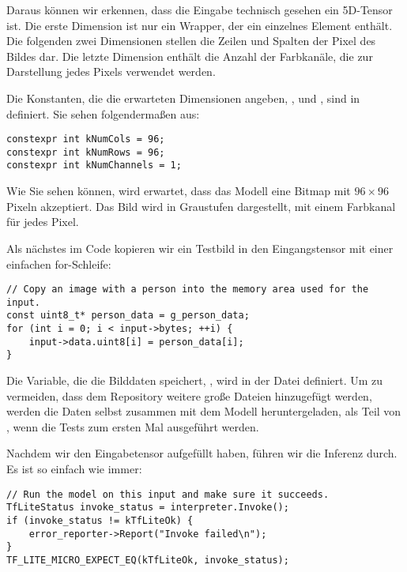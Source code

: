Daraus können wir erkennen, dass die Eingabe technisch gesehen ein 5D-Tensor ist. Die erste Dimension ist nur ein Wrapper, der ein einzelnes Element enthält. Die folgenden zwei Dimensionen stellen die Zeilen und Spalten der Pixel des Bildes dar. Die letzte Dimension enthält die Anzahl der Farbkanäle, die zur Darstellung jedes Pixels verwendet werden.

Die Konstanten, die die erwarteten Dimensionen angeben, ,  und , sind in  definiert. Sie sehen folgendermaßen aus:

\begin{code}
    \begin{lstlisting}
constexpr int kNumCols = 96;
constexpr int kNumRows = 96;
constexpr int kNumChannels = 1;
  \end{lstlisting}
\end{code}

Wie Sie sehen können, wird erwartet, dass das Modell eine Bitmap mit $96 \times 96$ Pixeln akzeptiert. Das Bild wird in Graustufen dargestellt, mit einem Farbkanal für jedes Pixel.

Als nächstes im Code kopieren wir ein Testbild in den Eingangstensor mit einer einfachen for-Schleife:

\begin{code}
    \begin{lstlisting}
// Copy an image with a person into the memory area used for the input.
const uint8_t* person_data = g_person_data;
for (int i = 0; i < input->bytes; ++i) {
    input->data.uint8[i] = person_data[i];
}
  \end{lstlisting}
\end{code}

Die Variable, die die Bilddaten speichert, , wird in der Datei  definiert. Um zu vermeiden, dass dem Repository weitere große Dateien hinzugefügt werden, werden die Daten selbst zusammen mit dem Modell heruntergeladen, als Teil von , wenn die Tests zum ersten Mal ausgeführt werden.

Nachdem wir den Eingabetensor aufgefüllt haben, führen wir die Inferenz durch. Es ist so einfach wie immer:

\begin{code}
    \begin{lstlisting}
// Run the model on this input and make sure it succeeds.
TfLiteStatus invoke_status = interpreter.Invoke();
if (invoke_status != kTfLiteOk) {
    error_reporter->Report("Invoke failed\n");
}
TF_LITE_MICRO_EXPECT_EQ(kTfLiteOk, invoke_status);
  \end{lstlisting}
\end{code}

